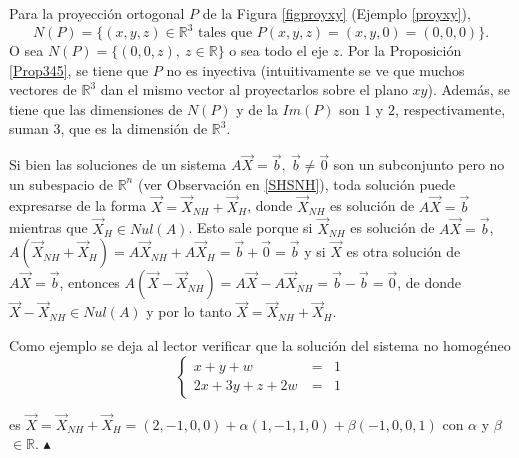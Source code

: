 \bigskip

\begin{example}
Para la proyección ortogonal $P$   de la Figura \ref{figproyxy} (Ejemplo \ref{proyxy}), $$N(P) = \{(x,y,z) \in \mathbb{R}^3 \text{  tales que  } P(x,y,z)=(x,y,0)=(0,0,0) \}.$$ O sea $N(P)= \{ (0,0,z), ~z \in \mathbb{R} \}$ o sea todo el eje $z$. Por  la Proposición \ref{Prop345}, se tiene que  $P$  no es inyectiva (intuitivamente se ve que muchos vectores de 
$\mathbb{R}^3$  dan el mismo vector al proyectarlos  sobre el plano $xy$).
Además, se tiene que  las dimensiones  de $N(P)$ y de la $Im(P)$ son $1$ y $2$, respectivamente, suman $3$, que es la dimensión de $\mathbb{R}^3$. 
\end{example}

\bigskip

\begin{remark}
Si bien las soluciones de un sistema $A\vec{X}=\vec{b}, ~  \vec{b} \neq \vec{0}$  son un subconjunto pero no un subespacio de    $\mathbb{R}^n$ (ver Observación 
 \textcolor{blue}{{\selectfont{i}}} en \ref{SHSNH}), toda solución puede expresarse de la forma $\vec{X}= \vec{X}_{NH} + \vec{X}_{H}$, donde  $\vec{X}_{NH}$ es solución de $A\vec{X}=\vec{b}$ mientras que  $\vec{X}_{H} \in Nul(A)$.
Esto sale porque si $\vec{X}_{NH}$ es solución de $A\vec{X}=\vec{b}$, $A(\vec{X}_{NH}+\vec{X}_{H})=  A\vec{X}_{NH}+ A\vec{X}_{H}=   \vec{b}+ \vec{0}= \vec{b} $ y si $\vec{X}$ es otra solución de $A\vec{X}=\vec{b}$, entonces $A(\vec{X}- \vec{X}_{NH})= A\vec{X}- A\vec{X}_{NH}=\vec{b}-\vec{b}=\vec{0} $, de donde $\vec{X}- \vec{X}_{NH}  \in Nul(A)$ y por lo tanto $\vec{X}=  \vec{X}_{NH} +\vec{X}_{H} $.

\bigskip

Como ejemplo se deja al lector verificar que la solución del sistema no homogéneo
\begin{equation} 
\left\{ \begin{array} {ccccl} \nonumber
                    x + y + w&\ =&1     \\
                     2x+3y+z+2w &\ = &1  
                    \end{array}
           \right.
\end{equation}

\bigskip
\noindent
es $\vec{X}=  \vec{X}_{NH} +\vec{X}_{H}= (2,-1,0,0)+ \alpha (1,-1,1,0) + \beta (-1,0,0,1) $ con $\alpha$ y $\beta$ $ \in \mathbb{R}$.
\hfill$\blacktriangle$
\end{remark}

\bigskip

